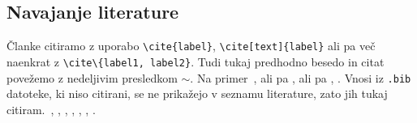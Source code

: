 \documentclass[mat2, anglescina, tisk]{fmfdelo}
\begin{document}
\begin{razsirjenipovzetek}
\subsection{Navajanje literature}
Članke citiramo z uporabo \verb|\cite{label}|, \verb|\cite[text]{label}| ali pa več naenkrat z
\verb|\cite\{label1, label2}|. Tudi tukaj predhodno besedo in citat povežemo z nedeljivim presledkom
$\sim$. Na primer~\cite{chen2006meshless,liu2001point}, ali pa \cite{kibriya2007empirical}, ali pa
\cite[str.\ 12]{trobec2015parallel}, \cite[enačba (2.3)]{pereira2016convergence}.
Vnosi iz \verb|.bib| datoteke, ki niso citirani, se ne prikažejo v seznamu literature, zato jih
tukaj citiram.~\cite{vene2000categorical}, \cite{gregoric2017stopniceni}, \cite{slak2015induktivni},
\cite{nsphere}, \cite{kearsley1975linearly}, \cite{STtemplate}, \cite{NunbergerTand}.

\end{razsirjenipovzetek}
\end{document}
